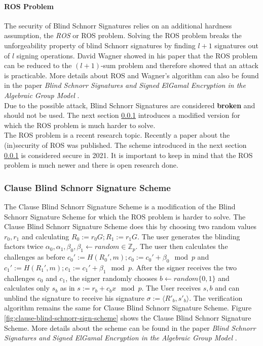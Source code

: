 \paragraph{ROS Problem}
\label{par:ros-problem}
The security of Blind Schnorr Signatures relies on an additional hardness assumption, the \textit{\acl{ROS}} or ROS problem. \cite{Schnorr01securityof}
Solving the \ac{ROS} problem breaks the unforgeability property of blind Schnorr signatures by finding $l + 1$ signatures out of $l$ signing operations.
David Wagner showed in his paper that the \ac{ROS} problem can be reduced to the $(l+1)$-sum problem and therefore showed that an attack is practicable. \cite{wagner:generalized-bday-prob}
More details about \ac{ROS} and Wagner's algorithm can also be found in the paper \textit{Blind Schnorr Signatures and Signed ElGamal Encryption in the Algebraic Group Model} \cite{cryptoeprint:2019:877}.
\\
Due to the possible attack, Blind Schnorr Signatures are considered \textbf{broken} and should not be used.
The next section \ref{sec:clause-blind-schnorr-sig} introduces a modified version for which the \ac{ROS} problem is much harder to solve.
\\
The \ac{ROS} problem is a recent research topic.
Recently a paper about the (in)security of \ac{ROS} was published. \cite{cryptoeprint:2020:945}
The scheme introduced in the next section \ref{sec:clause-blind-schnorr-sig} is considered secure in 2021.
It is important to keep in mind that the \ac{ROS} problem is much newer and there is open research done.

\subsubsection{Clause Blind Schnorr Signature Scheme}
\label{sec:clause-blind-schnorr-sig}
The Clause Blind Schnorr Signature Scheme is a modification of the Blind Schnorr Signature Scheme for which the \ac{ROS} problem is harder to solve.
The Clause Blind Schnorr Signature Scheme does this by choosing two random values $r_0, r_1$ and calculating $R_0 := r_0G; R_1 := r_1G$.
The user generates the blinding factors twice $\alpha_0, \alpha_1, \beta_0, \beta_1 \leftarrow random \in \mathbb{Z}_p$.
The user then calculates the challenges as before $c_0' := H(R_0',m); c_0 := c_0' + \beta_0 \mod p$ and $c_1' := H(R_1',m); c_1 := c_1' + \beta_1 \mod p$.
After the signer receives the two challenges $c_0$ and $c_1$, the signer randomly chooses $b \leftarrow random \{0, 1\}$ and calculates only $s_b$ as in $s := r_b+c_bx \mod p$.
The User receives $s, b$ and can unblind the signature to receive his signature $\sigma := \langle R'_b, s'_b \rangle$.
The verification algorithm remains the same for Clause Blind Schnorr Signature Scheme.
Figure \ref{fig:clause-blind-schnorr-sign-scheme} shows the Clause Blind Schnorr Signature Scheme.
More details about the scheme can be found in the paper \textit{Blind Schnorr Signatures and Signed ElGamal Encryption in the Algebraic Group Model} \cite{cryptoeprint:2019:877}.


